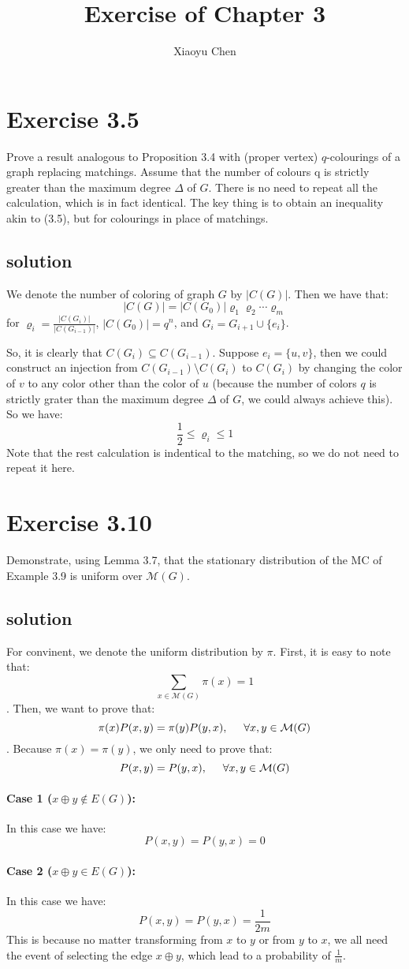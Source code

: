 \documentclass{article}
\title{Exercise of Chapter 3}
\author{Xiaoyu Chen}
\date{}
\begin{document}
\maketitle
\section{Exercise 3.5}
Prove a result analogous to Proposition 3.4 with (proper vertex) $q$-colourings of a graph replacing matchings. Assume that the number of colours q is strictly greater than the maximum degree $\Delta$ of $G$. There is no need to repeat all the calculation, which is in fact identical. The key thing is to obtain an inequality akin to (3.5), but for colourings in place of matchings.
\subsection{solution}
We denote the number of coloring of graph $G$ by $|C(G)|$. Then we have that:
\[
  |C(G)| = |C(G_0)|\varrho_1\varrho_2\cdots\varrho_m
\]
for $\varrho_i = \frac{|C(G_i)|}{|C(G_{i-1})|}$, $|C(G_0)| = q^n$, and $G_i = G_{i+1} \cup \{e_i\}$.

So, it is clearly that $C(G_i) \subseteq C(G_{i-1})$. Suppose $e_i = \{u, v\}$, then we could construct an injection from $C(G_{i-1}) \setminus C(G_i)$ to $C(G_i)$ by changing the color of $v$ to any color other than the color of $u$ (because the number of colors $q$ is strictly grater than the maximum degree $\Delta$ of $G$, we could always achieve this). So we have:
\[
  \frac{1}{2} \leq \varrho_i \leq 1
\]
Note that the rest calculation is indentical to the matching, so we do not need to repeat it here.

\section{Exercise 3.10}
Demonstrate, using Lemma 3.7, that the stationary distribution of the MC of Example 3.9 is uniform over $\mathcal{M}(G)$.
\subsection{solution}
For convinent, we denote the uniform distribution by $\pi$. First, it is easy to note that:
\[
  \sum_{x\in\mathcal{M}(G)}\pi(x) = 1
\]. Then, we want to prove that:
\[
  \pi(x)P(x,y) = \pi(y)P(y, x), \hspace{0.5cm} \forall x, y\in \mathcal{M}(G) 
\]. Because $\pi(x) = \pi(y)$, we only need to prove that:
\[
  P(x,y) = P(y,x), \hspace{0.5cm} \forall x, y\in \mathcal{M}(G)
\]
\paragraph{Case 1 ($x \oplus y \not\in E(G)$):} In this case we have:
\[
  P(x,y) = P(y, x) = 0
\]
\paragraph{Case 2 ($x \oplus y \in E(G)$):} In this case we have:
\[
  P(x,y) = P(y, x) = \frac{1}{2m}
\] This is because no matter transforming from $x$ to $y$ or from $y$ to $x$, we all need the event of selecting the edge $x\oplus y$, which lead to a probability of $\frac{1}{m}$.
\end{document}
